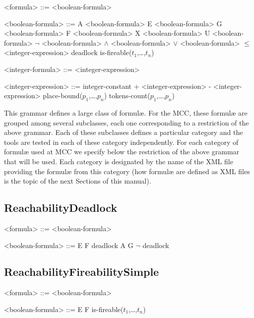 \documentclass[10pt,english,a4paper]{article}
\begin{document}
\begin{grammar}
<formula> ::= <boolean-formula>

<boolean-formula> ::= A <boolean-formula>
\alt E <boolean-formula>
\alt G <boolean-formula>
\alt F <boolean-formula>
\alt X <boolean-formula>
 U <boolean-formula>
\alt $\lnot$ <boolean-formula>
 $\wedge$ <boolean-formula>
 $\vee$ <boolean-formula>
 $\leq$ <integer-expression>
\alt deadlock
\alt is-fireable($t_1$,\dots,$t_n$)

<integer-formula> ::= <integer-expression>

<integer-expression> ::= integer-constant
 + <integer-expression>
 - <integer-expression>
\alt place-bound($p_1$,\dots,$p_n$)
\alt tokens-count($p_1$,\dots,$p_n$)

\end{grammar}

This grammar defines a large class of formulæ.
For the MCC, these formulæ are grouped among several subclasses, each one corresponding to a restriction of the above grammar.
Each of these subclasses defines a particular category and the tools are tested in each of these category independently.
For each category of formulæ used at MCC we specify below the restriction of the above grammar that will be used.
Each category is designated by the name of the XML file providing the formulæ from this category (how formulæ are defined as XML files is the topic of the next Sections of this manual).

\subsection{ReachabilityDeadlock}

\begin{grammar}

<formula> ::= <boolean-formula>

<boolean-formula> ::= E F deadlock 
\alt A G $\lnot$ deadlock

\end{grammar}

\subsection{ReachabilityFireabilitySimple}

\begin{grammar}

<formula> ::= <boolean-formula> 

<boolean-formula> ::= E F is-fireable($t_1$,\dots,$t_n$)

\end{grammar}
\end{document}
